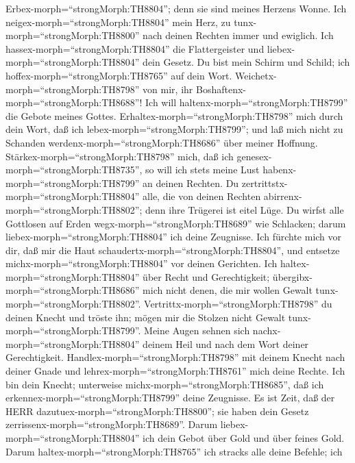 Erbex-morph=``strongMorph:TH8804''; denn sie sind meines Herzens Wonne.
 Ich neigex-morph=``strongMorph:TH8804'' mein Herz, zu
tunx-morph=``strongMorph:TH8800'' nach deinen Rechten immer und
ewiglich.  Ich hassex-morph=``strongMorph:TH8804'' die
Flattergeister und liebex-morph=``strongMorph:TH8804'' dein Gesetz.
 Du bist mein Schirm und Schild; ich
hoffex-morph=``strongMorph:TH8765'' auf dein Wort. 
Weichetx-morph=``strongMorph:TH8798'' von mir, ihr
Boshaftenx-morph=``strongMorph:TH8688''! Ich will
haltenx-morph=``strongMorph:TH8799'' die Gebote meines Gottes.
 Erhaltex-morph=``strongMorph:TH8798'' mich durch dein
Wort, daß ich lebex-morph=``strongMorph:TH8799''; und laß mich nicht zu
Schanden werdenx-morph=``strongMorph:TH8686'' über meiner Hoffnung.
 Stärkex-morph=``strongMorph:TH8798'' mich, daß ich
genesex-morph=``strongMorph:TH8735'', so will ich stets meine Lust
habenx-morph=``strongMorph:TH8799'' an deinen Rechten.  Du
zertrittstx-morph=``strongMorph:TH8804'' alle, die von deinen Rechten
abirrenx-morph=``strongMorph:TH8802''; denn ihre Trügerei ist eitel
Lüge.  Du wirfst alle Gottlosen auf Erden
wegx-morph=``strongMorph:TH8689'' wie Schlacken; darum
liebex-morph=``strongMorph:TH8804'' ich deine Zeugnisse. 
Ich fürchte mich vor dir, daß mir die Haut
schaudertx-morph=``strongMorph:TH8804'', und entsetze
michx-morph=``strongMorph:TH8804'' vor deinen Gerichten. 
Ich haltex-morph=``strongMorph:TH8804'' über Recht und Gerechtigkeit;
übergibx-morph=``strongMorph:TH8686'' mich nicht denen, die mir wollen
Gewalt tunx-morph=``strongMorph:TH8802''. 
Vertrittx-morph=``strongMorph:TH8798'' du deinen Knecht und tröste ihn;
mögen mir die Stolzen nicht Gewalt tunx-morph=``strongMorph:TH8799''.
 Meine Augen sehnen sich
nachx-morph=``strongMorph:TH8804'' deinem Heil und nach dem Wort deiner
Gerechtigkeit.  Handlex-morph=``strongMorph:TH8798'' mit
deinem Knecht nach deiner Gnade und lehrex-morph=``strongMorph:TH8761''
mich deine Rechte.  Ich bin dein Knecht; unterweise
michx-morph=``strongMorph:TH8685'', daß ich
erkennex-morph=``strongMorph:TH8799'' deine Zeugnisse.  Es
ist Zeit, daß der HERR dazutuex-morph=``strongMorph:TH8800''; sie haben
dein Gesetz zerrissenx-morph=``strongMorph:TH8689''. 
Darum liebex-morph=``strongMorph:TH8804'' ich dein Gebot über Gold und
über feines Gold.  Darum
haltex-morph=``strongMorph:TH8765'' ich stracks alle deine Befehle; ich
